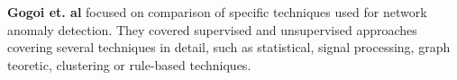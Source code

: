 %
\textbf{Gogoi et. al} \cite{gogoi2011survey} focused on comparison of specific techniques used for network anomaly
detection. They covered supervised and unsupervised approaches covering several techniques in detail, such as
statistical, signal processing, graph teoretic, clustering  or rule-based techniques.


